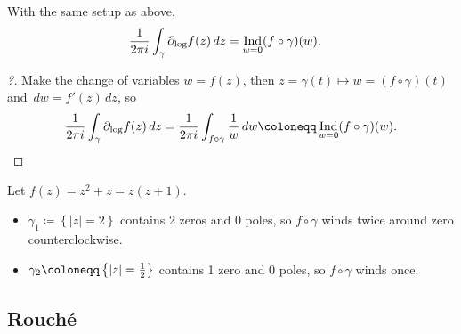 \begin{theorem}

With the same setup as above,
\begin{align*}
{1\over 2\pi i} \int_\gamma {\partial}_{\log} f(z) \,dz
&= \mathop{\mathrm{Ind}}_{w=0}(f\circ \gamma)(w)
.\end{align*}

\end{theorem}

\begin{proof}[?]

Make the change of variables \(w = f(z)\), then
\(z=\gamma(t) \mapsto w = (f\circ \gamma)(t)\) and \(\,dw= f'(z) \,dz\),
so
\begin{align*}
{1\over 2\pi i }\int_{\gamma} {\partial}_{\log} f(z) \,dz
= {1\over 2\pi i} \int_{f\circ \gamma} {1\over w} \,dw\coloneqq\mathop{\mathrm{Ind}}_{w=0} (f\circ \gamma)(w)
.\end{align*}

\end{proof}

\begin{example}

Let \(f(z) = z^2 + z = z(z+1)\).

\begin{itemize}
\tightlist
\item
  \(\gamma_1 \coloneqq\left\{{{\left\lvert {z} \right\rvert} = 2}\right\}\)
  contains 2 zeros and 0 poles, so \(f\circ \gamma\) winds twice around
  zero counterclockwise.
\item
  \(\gamma_2 \coloneqq\left\{{{\left\lvert {z} \right\rvert} = {1\over 2}}\right\}\)
  contains 1 zero and 0 poles, so \(f\circ \gamma\) winds once.
\end{itemize}

\end{example}

\hypertarget{rouchuxe9}{%
\subsection{Rouché}\label{rouchuxe9}}

